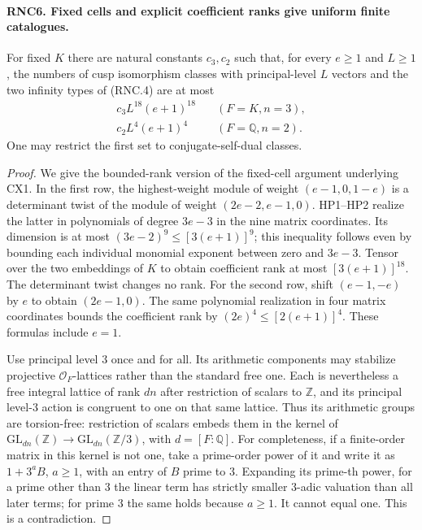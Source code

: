 \paragraph{RNC6. Fixed cells and explicit coefficient ranks give uniform finite catalogues.}
\label{claim:RNC6}
For fixed $K$ there are natural constants $c_3,c_2$ such that,
for every $e\geq1$ and $L\geq1$, the numbers of cusp
isomorphism classes with principal-level $L$ vectors and the
two infinity types of (RNC.4) are at most
\[
 \begin{split}
 c_3 L^{18}(e+1)^{18}&\quad(F=K,n=3),\\
 c_2 L^4(e+1)^4&\quad(F=\mathbb Q,n=2).
 \end{split}                                                   \tag{RNC.12}
\]
One may restrict the first set to conjugate-self-dual classes.
\begin{proof}
We give the bounded-rank version of the fixed-cell argument
underlying CX1.  In the first row, the highest-weight module
of weight $(e-1,0,1-e)$ is a determinant twist of the module
of weight $(2e-2,e-1,0)$.  HP1--HP2 realize the latter in
polynomials of degree $3e-3$ in the nine matrix coordinates.
Its dimension is at most $(3e-2)^9\leq[3(e+1)]^9$; this
inequality follows even by bounding each individual monomial
exponent between zero and $3e-3$.  Tensor over the two
embeddings of $K$ to obtain coefficient rank at most
$[3(e+1)]^{18}$.  The determinant twist changes no rank.
For the second row, shift $(e-1,-e)$ by $e$ to obtain
$(2e-1,0)$.  The same polynomial realization in four matrix
coordinates bounds the coefficient rank by
$(2e)^4\leq[2(e+1)]^4$.  These formulas include $e=1$.

Use principal level $3$ once and for all.  Its arithmetic
components may stabilize projective $\mathcal O_F$-lattices
rather than the standard free one.  Each is nevertheless
a free integral lattice of rank $dn$ after restriction of
scalars to $\mathbb Z$, and its principal level-$3$ action
is congruent to one on that same lattice.  Thus its arithmetic
groups are torsion-free: restriction of scalars embeds them
in the kernel of $\mathrm{GL}_{dn}(\mathbb Z)\to
\mathrm{GL}_{dn}(\mathbb Z/3)$, with $d=[F:\mathbb Q]$.
For completeness, if a finite-order matrix in this kernel
is not one, take a prime-order power of it and write it as
$1+3^a B$, $a\geq1$, with an entry of $B$ prime to $3$.
Expanding its prime-th power, for a prime other than $3$
the linear term has strictly smaller $3$-adic valuation
than all later terms; for prime $3$ the same holds because
$a\geq1$.  It cannot equal one.  This is a contradiction.


\end{proof}
